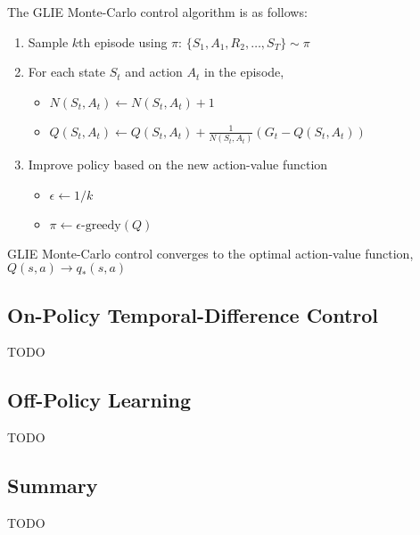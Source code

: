 \noindent The GLIE Monte-Carlo control algorithm is as follows:

\begin{enumerate}
    \item Sample $k$th episode using $\pi$: $\{S_1, A_1, R_2, \dots, S_T\} \sim \pi$
    \item For each state $S_t$ and action $A_t$ in the episode,
          \begin{itemize}
              \item $N(S_t, A_t) \leftarrow N(S_t, A_t) + 1$
              \item $Q(S_t, A_t) \leftarrow Q(S_t, A_t) + \frac{1}{N(S_t, A_t)} (G_t - Q(S_t, A_t))$
          \end{itemize}
    \item Improve policy based on the new action-value function
          \begin{itemize}
              \item $\epsilon \leftarrow 1/k$
              \item $\pi \leftarrow \epsilon\text{-greedy}(Q)$
          \end{itemize}
\end{enumerate}

\noindent GLIE Monte-Carlo control converges to the optimal action-value function, $Q(s,
    a) \rightarrow q_*(s, a)$

\subsection{On-Policy Temporal-Difference Control}

TODO

\subsection{Off-Policy Learning}

TODO

\subsection{Summary}

TODO

